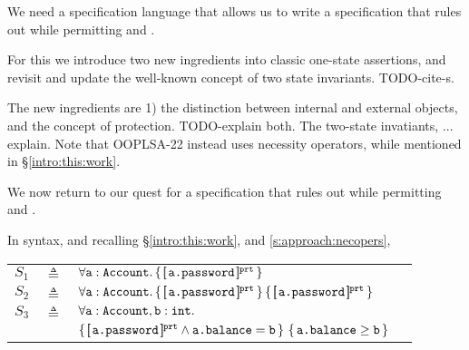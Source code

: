 We need  a specification language that allows us to write a specification that rules out \ModB while permitting \ModA and
\ModC.  

For this we introduce two new ingredients into classic one-state assertions, and revisit and update the well-known concept of two state invariants. TODO-cite-s.\

The new ingredients are 1) the distinction between internal and external objects, and the concept of protection. TODO-explain both.
The two-state invatiants, ... explain.
Note that OOPLSA-22 instead uses    necessity operators, while mentioned in  \S \ref{intro:this:work}. 



\label{s:bankSpecEx}

We now {return to our quest for} a specification that rules out \ModB while permitting \ModA and
\ModC. 


In \Nec  syntax, and {recalling \S \ref{intro:this:work}, and \ref{s:approach:necopers},}
 
 \begin{tabular}{lcll}
$S_1$   &     $\triangleq$   & $\forall {{\texttt{a}}:{\texttt{Account}} }.\, {\{}\, [\!\![ \,{\texttt{a.password}}\, ]\!\!]^{{\texttt{prt}}} \,{\}}  $
 \\
 $S_2$   & $\triangleq$   &  $\TwoStatesQ {\prg{a}:\prg{Account}}  {\inside{\prg{a.password}}} {\inside{\prg{a.password}}}$
 \\
$S_3$ & $\triangleq$   &
  $\forall {\texttt{a}}:{\texttt{Account}},{\texttt{b}}:{\texttt{int}}.$\\
  &  &  ${\{}\, [\!\![ \,{\texttt{a.password}}\, ]\!\!]^{{\texttt{prt}}} \wedge {\texttt{a.balance}}={\texttt{b}} \,{\}}  
\  {\{}\,  {\texttt{a.balance}}\geq {\texttt{b}}  \,{\}}$
 \end{tabular}



